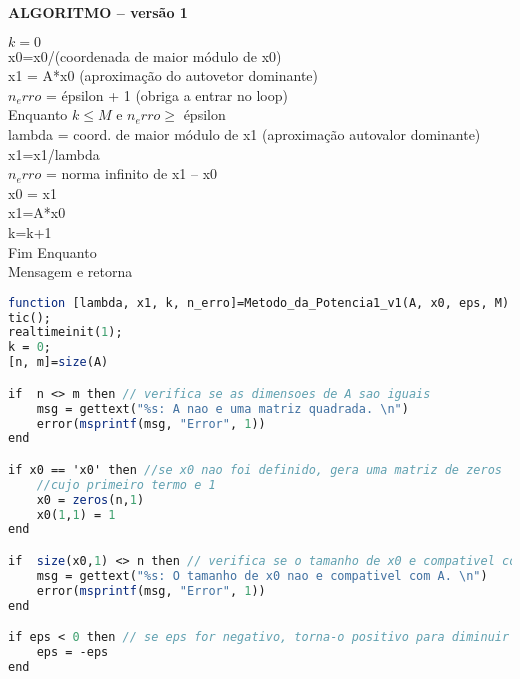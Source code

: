 \documentclass[leqno]{article}
\numberwithin{equation}{section}
\begin{document}
\begin{enumerate}
		\textbf{{\large ALGORITMO – versão 1}}\\
		\begin{tcolorbox}[colback=gray!5,colframe=gray!40!black]	
		$k=0$\\
		x0=x0/(coordenada de maior módulo de x0)\\
		x1 = A*x0 (aproximação do autovetor dominante)\\
		$n_erro$ = épsilon + 1 (obriga a entrar no loop)\\
		Enquanto $k \leq M$ e $n_erro \geq$ épsilon \\
		\hspace*{3ex}	lambda = coord. de maior módulo de x1 (aproximação autovalor dominante)\\
		\hspace*{3ex}	x1=x1/lambda\\
		\hspace*{3ex}	$n_erro$ = norma infinito de x1 – x0\\
		\hspace*{3ex}	x0 = x1\\
		\hspace*{3ex}	x1=A*x0\\
		\hspace*{3ex} 	k=k+1\\
		Fim Enquanto\\
		Mensagem e retorna\\
		\end{tcolorbox}
		
		\begin{sol}			
			
			\begin{lstlisting}[style=mystyle, language=Scilab]
function [lambda, x1, k, n_erro]=Metodo_da_Potencia1_v1(A, x0, eps, M)
tic();
realtimeinit(1);
k = 0;
[n, m]=size(A)

if  n <> m then // verifica se as dimensoes de A sao iguais
	msg = gettext("%s: A nao e uma matriz quadrada. \n")
	error(msprintf(msg, "Error", 1))
end

if x0 == 'x0' then //se x0 nao foi definido, gera uma matriz de zeros
	//cujo primeiro termo e 1
	x0 = zeros(n,1)
	x0(1,1) = 1
end

if  size(x0,1) <> n then // verifica se o tamanho de x0 e compativel com A
	msg = gettext("%s: O tamanho de x0 nao e compativel com A. \n")
	error(msprintf(msg, "Error", 1))
end

if eps < 0 then // se eps for negativo, torna-o positivo para diminuir iteracoes
	eps = -eps
end


\end{lstlisting}
\end{sol}
\end{enumerate}
\end{document}
